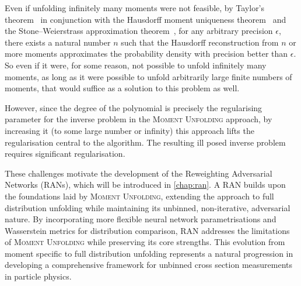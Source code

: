         Even if unfolding infinitely many moments were not feasible, by Taylor's theorem~\cite{taylor_methodus_1715} in conjunction with the Hausdorff moment uniqueness theorem~\cite{Hausdorff1921} and the Stone--Weierstrass approximation theorem~\cite{weierstras_uber_1885, pani_generalized_2024}, for any arbitrary precision \(\epsilon\), there exists a natural number \(n\) such that the Hausdorff reconstruction from \(n\) or more moments approximates the probability density with precision better than \(\epsilon.\)
        So even if it were, for some reason, not possible to unfold infinitely many moments, as long as it were possible to unfold arbitrarily large finite numbers of moments, that would suffice as a solution to this problem as well.
        
        However, since the degree of the polynomial is precisely the regularising parameter for the inverse problem in the \textsc{Moment Unfolding} approach, by increasing it (to some large number or infinity) this approach lifts the regularisation central to the algorithm.
        The resulting ill posed inverse problem requires significant regularisation.

        These challenges motivate the development of the Reweighting Adversarial Networks (RANs), which will be introduced in \cref{chap:ran}.
        A RAN builds upon the foundations laid by \textsc{Moment Unfolding}, extending the approach to full distribution unfolding while maintaining its unbinned, non-iterative, adversarial nature.
        By incorporating more flexible neural network parametrisations and Wasserstein metrics for distribution comparison, RAN addresses the limitations of \textsc{Moment Unfolding} while preserving its core strengths.
        This evolution from moment specific to full distribution unfolding represents a natural progression in developing a comprehensive framework for unbinned cross section measurements in particle physics.